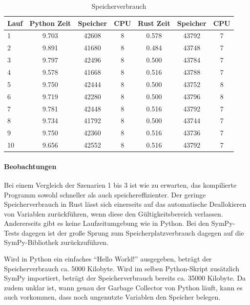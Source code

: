 \documentclass[11pt,a4paper, ngerman]{article}
\begin{document}
\begin{table}[ht!]
    \caption{Speicherverbrauch}
    \centering
    \begin{tabular}{|l|c|c|c|c|c|c|}
        \hline
        \textbf{Lauf} & \textbf{Python Zeit} & \textbf{Speicher} & \textbf{CPU} & \textbf{Rust Zeit} & \textbf{Speicher} & \textbf{CPU} \\
        \hline
        1 & 9.703 & 42608 & 8 & 0.578 & 43792 & 7 \\
        \hline
        2 & 9.891 & 41680 & 8 & 0.484 & 43748 & 7 \\
        \hline
        3 & 9.797 & 42496 & 8 & 0.500 & 43784 & 7 \\
        \hline
        4 & 9.578 & 41668 & 8 & 0.516 & 43788 & 7 \\
        \hline
        5 & 9.750 & 42444 & 8 & 0.500 & 43752 & 8 \\
        \hline
        6 & 9.719 & 42280 & 8 & 0.500 & 43796 & 8 \\
        \hline
        7 & 9.781 & 42448 & 8 & 0.516 & 43792 & 7 \\
        \hline
        8 & 9.734 & 41792 & 8 & 0.500 & 43744 & 7 \\
        \hline
        9 & 9.750 & 42360 & 8 & 0.516 & 43736 & 7 \\
        \hline
        10 & 9.656 & 42552 & 8 & 0.516 & 43792 & 7 \\
        \hline
    \end{tabular}
\end{table}

\paragraph{Beobachtungen} Bei einem Vergleich der Szenarien 1 bis 3 ist wie zu erwarten, das kompilierte Programm sowohl schneller als auch speichereffizienter. Der geringe Speicherverbrauch in Rust lässt sich einerseits auf das automatische Deallokieren von Variablen zurückführen, wenn diese den Gültigkeitsbereich verlassen. Andererseits gibt es keine Laufzeitumgebung wie in Python. Bei den SymPy-Tests dagegen ist der große Sprung zum Speicherplatzverbrauch dagegen auf die SymPy-Bibliothek zurückzuführen.

Wird in Python ein einfaches ``Hello World!'' ausgegeben, beträgt der Speicherverbrauch ca. 5000 Kilobyte. Wird im selben Python-Skript zusätzlich SymPy importiert, beträgt der Speicherverbrauch bereits ca. 35000 Kilobyte. Da zudem unklar ist, wann genau der Garbage Collector von Python läuft, kann es auch vorkommen, dass noch ungenutzte Variablen den Speicher belegen.
\end{document}
